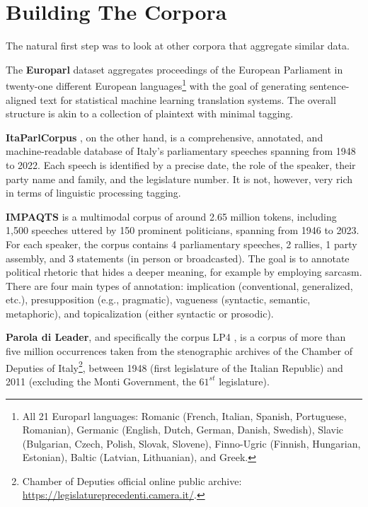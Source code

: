 \section{Building The Corpora}

The natural first step was to look at other corpora that aggregate similar data.  

The \textbf{Europarl} dataset \cite{koehn_europarl_2005} aggregates proceedings of the European Parliament in twenty-one different European languages\footnote{All 21 Europarl languages: Romanic (French, Italian, Spanish, Portuguese, Romanian), Germanic (English, Dutch, German, Danish, Swedish), Slavic (Bulgarian, Czech, Polish, Slovak, Slovene), Finno-Ugric (Finnish, Hungarian, Estonian), Baltic (Latvian, Lithuanian), and Greek.} with the goal of generating sentence-aligned text for statistical machine learning translation systems. The overall structure is akin to a collection of plaintext with minimal tagging.

\textbf{ItaParlCorpus} \cite{cova_new_2025}, on the other hand, is a comprehensive, annotated, and machine-readable database of Italy's parliamentary speeches spanning from 1948 to 2022. Each speech is identified by a precise date, the role of the speaker, their party name and family, and the legislature number. It is not, however, very rich in terms of linguistic processing tagging.

\textbf{IMPAQTS} \cite{cominetti_impaqts_2024} is a multimodal corpus of around 2.65 million tokens, including 1,500 speeches uttered by 150 prominent politicians, spanning from 1946 to 2023. For each speaker, the corpus contains 4 parliamentary speeches, 2 rallies, 1 party assembly, and 3 statements (in person or broadcasted). The goal is to annotate political rhetoric that hides a deeper meaning, for example by employing sarcasm. There are four main types of annotation: implication (conventional, generalized, etc.), presupposition (e.g., pragmatic), vagueness (syntactic, semantic, metaphoric), and topicalization (either syntactic or prosodic).

\textbf{Parola di Leader}, and specifically the corpus LP4 \cite{giuliano_il_2019}, is a corpus of more than five million occurrences taken from the stenographic archives of the Chamber of Deputies of Italy\footnote{Chamber of Deputies official online public archive: \url{https://legislatureprecedenti.camera.it/}.}, between 1948 (first legislature of the Italian Republic) and 2011 (excluding the Monti Government, the $61^{st}$ legislature).

